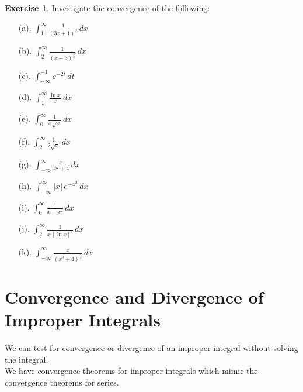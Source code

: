 \documentclass[12pt,a4paper]{report}
\theoremstyle{definition}
\newtheorem{exe}[thm]{Exercise}
\theoremstyle{plain}
\begin{document}
\begin{exe}
Investigate the convergence of the following:
\begin{multicols}{3}
\begin{enumerate}
\item[(a).]$\displaystyle{\int^{\infty}_1\frac{1}{(3x + 1)^2}\, dx}$
\item[(b).] $\displaystyle{\int_2^{\infty} \frac{1}{(x + 3)^{\frac{3}{2}}}\, dx}$
\item[(c).] $\displaystyle{\int^{-1}_{-\infty} e^{-2t}\, dt}$
\item[(d).] $\displaystyle{\int_1^{\infty} \frac{\ln x}{x}}\ dx$
\item[(e).] $\displaystyle{\int_0^{\infty} \frac{1}{x\sqrt{x}}\, dx}$
\item[(f).] $\displaystyle{\int_2^{\infty} \frac{1}{2\sqrt{x}}\, dx}$
\item[(g).] $\displaystyle{\int_{-\infty}^{\infty}\frac{x}{x^2 + 4}\, dx}$
\item[(h).] $\displaystyle{\int_{-\infty}^{\infty} |x|\, e^{-x^2}\, dx}$
\item[(i).] $\displaystyle{\int_0^{\infty} \frac{1}{x + x^2}\, dx}$
\item[(j).] $\displaystyle{\int_2^{\infty} \frac{1}{x\, \left[\ln x\right]^2}\, dx}$
\item[(k).] $\displaystyle{\int^{\infty}_{-\infty} \frac{x}{(x^2 + 4)^{\frac{3}{2}}}\, dx}$
\end{enumerate}
\end{multicols}
\end{exe}




















\section{Convergence and Divergence of Improper Integrals}
\vspace*{-5mm}
We can test for convergence or divergence of an improper integral without solving the integral. \\
We have convergence theorems for improper integrals which mimic the convergence theorems for series.
\end{document}
